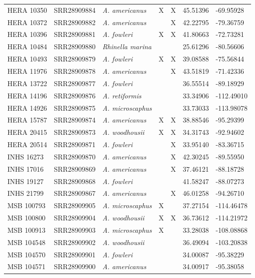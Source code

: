 \begin{longtable}{ lllllll }
HERA 10350 & SRR28909884 & \textit{A. americanus} & X & X & 45.51396 & -69.95928 \\ 
HERA 10372 & SRR28909882 & \textit{A. americanus} &  & X & 42.22795 & -79.36759 \\ 
HERA 10396 & SRR28909881 & \textit{A. fowleri} & X & X & 41.80663 & -72.73281 \\ 
HERA 10484 & SRR28909880 & \textit{Rhinella marina} &  &  & 25.61296 & -80.56606 \\ 
HERA 10493 & SRR28909879 & \textit{A. fowleri} & X & X & 39.08588 & -75.56844 \\ 
HERA 11976 & SRR28909878 & \textit{A. americanus} &  & X & 43.51819 & -71.42336 \\ 
HERA 13722 & SRR28909877 & \textit{A. fowleri} &  &  & 36.55514 & -89.18929 \\ 
HERA 14196 & SRR28909876 & \textit{A. retiformis} &  &  & 33.34906 & -112.49010 \\ 
HERA 14926 & SRR28909875 & \textit{A. microscaphus} &  &  & 33.73033 & -113.98078 \\ 
HERA 15787 & SRR28909874 & \textit{A. americanus} & X & X & 38.88546 & -95.29399 \\ 
HERA 20415 & SRR28909873 & \textit{A. woodhousii} & X & X & 34.31743 & -92.94602 \\ 
HERA 20514 & SRR28909871 & \textit{A. fowleri} &  & X & 33.95140 & -83.36715 \\ 
INHS 16273 & SRR28909870 & \textit{A. americanus} &  & X & 42.30245 & -89.55950 \\ 
INHS 17016 & SRR28909869 & \textit{A. americanus} &  & X & 37.46121 & -88.18728 \\ 
INHS 19127 & SRR28909868 & \textit{A. fowleri} &  &  & 41.58247 & -88.07273 \\ 
INHS 21799 & SRR28909867 & \textit{A. americanus} &  & X & 46.01258 & -94.26710 \\ 
MSB 100793 & SRR28909905 & \textit{A. microscaphus} & X &  & 37.27154 & -114.46478 \\ 
MSB 100800 & SRR28909904 & \textit{A. woodhousii} & X & X & 36.73612 & -114.21972 \\ 
MSB 100913 & SRR28909903 & \textit{A. microscaphus} & X &  & 33.28038 & -108.08868 \\ 
MSB 104548 & SRR28909902 & \textit{A. woodhousii} &  &  & 36.49094 & -103.20838 \\ 
MSB 104570 & SRR28909901 & \textit{A. fowleri} &  &  & 34.00087 & -95.38229 \\ 
MSB 104571 & SRR28909900 & \textit{A. americanus} &  &  & 34.00917 & -95.38058 \\ 

\end{longtable}
